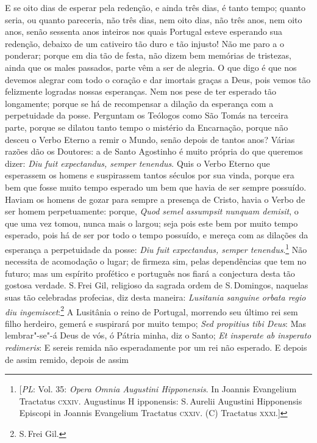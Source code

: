 E se oito dias de esperar pela redenção, e ainda três dias, é tanto
tempo; quanto seria, ou quanto pareceria, não três dias, nem oito dias,
não três anos, nem oito anos, senão sessenta anos inteiros nos quais
Portugal esteve esperando sua redenção, debaixo de um cativeiro tão duro
e tão injusto! Não me paro a o ponderar; porque em dia tão de festa, não
dizem bem memórias de tristezas, ainda que os males passados, parte vêm
a ser de alegria. O que digo é que nos devemos alegrar com todo o
coração e dar imortais graças a Deus, pois vemos tão felizmente logradas
nossas esperanças. Nem nos pese de ter esperado tão longamente; porque
se há de recompensar a dilação da esperança com a perpetuidade da posse.
Perguntam os Teólogos como São Tomás na terceira parte, porque se
dilatou tanto tempo o mistério da Encarnação, porque não desceu o Verbo
Eterno a remir o Mundo, senão depois de tantos anos? Várias razões dão
os Doutores: a de Santo Agostinho é muito própria do que queremos dizer:
\emph{Diu fuit expectandus, semper tenendus}. Quis o Verbo Eterno que
esperassem os homens e suspirassem tantos séculos por sua vinda, porque
era bem que fosse muito tempo esperado um bem que havia de ser sempre
possuído. Haviam os homens de gozar para sempre a presença de Cristo,
havia o Verbo de ser homem perpetuamente: porque, \emph{Quod semel
assumpsit nunquam demisit}, o que uma vez tomou, nunca mais o largou;
seja pois este bem por muito tempo esperado, pois há de ser por todo o
tempo possuído, e mereça com as dilações da esperança a perpetuidade da
posse: \emph{Diu fuit expectandus, semper tenendus}.\footnote{[\textit{PL}: Vol. 35: \textit{Opera Omnia Augustini Hipponensis}. In Joannis Evangelium Tractatus \textsc{cxxiv}. Augustinus H ipponensis: S.\,Aurelii Augustini Hipponensis Episcopi in Joannis Evangelium Tractatus \textsc{cxxiv}. (C) Tractatus \textsc{xxxi}.]}
Não necessita de acomodação o lugar; de firmeza sim, pelas dependências
que tem no futuro; mas um espírito profético e português nos fiará a
conjectura desta tão gostosa verdade. S.\,Frei Gil, religioso da sagrada
ordem de S.\,Domingos, naquelas suas tão celebradas profecias, diz desta
maneira: \emph{Lusitania sanguine orbata regio diu ingemiscet}:\footnote{S.\,Frei Gil.} A
Lusitânia o reino de Portugal, morrendo seu último rei sem filho
herdeiro, gemerá e suspirará por muito tempo; \emph{Sed propitius tibi
Deus}: Mas lembrar"-se"-á Deus de vós, ó Pátria minha, diz o Santo; \emph{Et
insperate ab insperato redimeris}: E sereis remida não esperadamente
por um rei não esperado. E depois de assim remido, depois de assim
